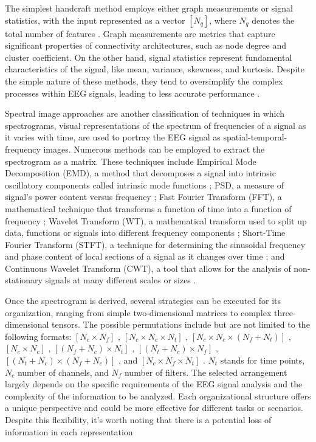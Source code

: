 The simplest handcraft method employs either graph measurements or signal statistics, with the input represented as a vector $[N_q]$, where $N_q$ denotes the total number of features \cite{gu2023decoding}. Graph measurements are metrics that capture significant properties of connectivity architectures, such as node degree and cluster coefficient. On the other hand, signal statistics represent fundamental characteristics of the signal, like mean, variance, skewness, and kurtosis. Despite the simple nature of these methods, they tend to oversimplify the complex processes within EEG signals, leading to less accurate performance \cite{gonzalez2020network}.

Spectral image approaches are another classification of techniques in which spectrograms, visual representations of the spectrum of frequencies of a signal as it varies with time, are used to portray the EEG signal as spatial-temporal-frequency images. Numerous methods can be employed to extract the spectrogram as a matrix. These techniques include Empirical Mode Decomposition (EMD), a method that decomposes a signal into intrinsic oscillatory components called intrinsic mode functions \cite{tang2020motor}; PSD, a measure of signal's power content versus frequency \cite{ma2020dwt}; Fast Fourier Transform (FFT), a mathematical technique that transforms a function of time into a function of frequency \cite{hassanpour2019novel}; Wavelet Transform (WT), a mathematical transform used to split up data, functions or signals into different frequency components \cite{ortiz2019new}; Short-Time Fourier Transform (STFT), a technique for determining the sinusoidal frequency and phase content of local sections of a signal as it changes over time \cite{tayeb2019validating}; and Continuous Wavelet Transform (CWT), a tool that allows for the analysis of non-stationary signals at many different scales or sizes \cite{lee2019application}.

Once the spectrogram is derived, several strategies can be executed for its organization, ranging from simple two-dimensional matrices to complex three-dimensional tensors. The possible permutations include but are not limited to the following formats: $[N_c \times N_f]$ \cite{ma2020dwt}, $[N_c \times N_c \times N_t]$ \cite{wang2019stable}, $[N_c \times N_c \times (N_f+N_t)]$  \cite{collazos2023posthoc}, $[N_c \times N_c]$ \cite{kwon2021visual}, $[(N_f + N_c)\times N_t]$ \cite{zhang2020motor}, $[(N_t + N_c)\times N_f]$ \cite{kant2020cwt}, $[(N_t + N_c)\times (N_f + N_c)]$ \cite{alwasiti2020motor}, and $[N_c \times N_f \times N_t]$ \cite{miao2020spatial}. $N_t$ stands for time points, $N_c$ number of channels, and $N_f$ number of filters. The selected arrangement largely depends on the specific requirements of the EEG signal analysis and the complexity of the information to be analyzed. Each organizational structure offers a unique perspective and could be more effective for different tasks or scenarios. Despite this flexibility, it's worth noting that there is a potential loss of information in each representation \cite{altaheri2023deep}

